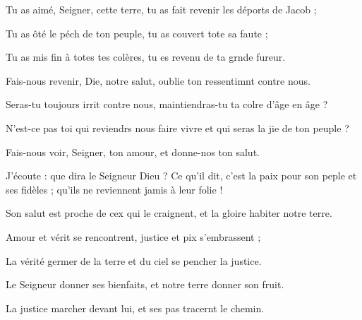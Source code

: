 \item Tu as aimé, Seigner, cette terre, tu as fait revenir les déports de Jacob ;
\item Tu as ôté le péch de ton peuple, tu as couvert tote sa faute ;
\item Tu as mis fin à totes tes colères, tu es revenu de ta grnde fureur.
\item Fais-nous revenir, Die, notre salut, oublie ton ressentimnt contre nous.
\item Seras-tu toujours irrit contre nous, maintiendras-tu ta colre d’âge en âge ?
\item N’est-ce pas toi qui reviendrs nous faire vivre et qui seras la jie de ton peuple ?
\item Fais-nous voir, Seigner, ton amour, et donne-nos ton salut.
\item J’écoute : que dira le Seigneur Dieu ? Ce qu’il dit, c’est la paix pour son peple et ses fidèles ; qu’ils ne reviennent jamis à leur folie !
\item Son salut est proche de cex qui le craignent, et la gloire habiter notre terre.
\item Amour et vérit se rencontrent, justice et pix s’embrassent ;
\item La vérité germer de la terre et du ciel se pencher la justice.
\item Le Seigneur donner ses bienfaits, et notre terre donner son fruit.
\item La justice marcher devant lui, et ses pas tracernt le chemin.